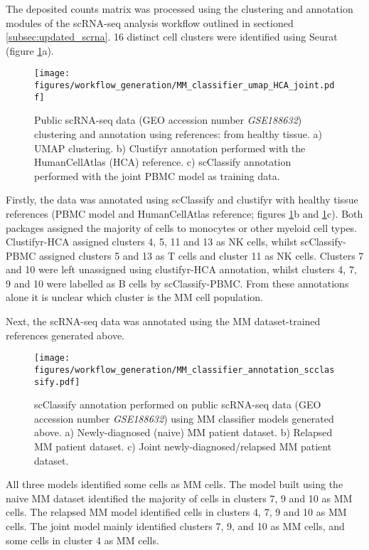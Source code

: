 The deposited counts matrix was processed using the clustering and annotation modules of the scRNA-seq analysis workflow outlined in sectioned \ref{subsec:updated_scrna}.
16 distinct cell clusters were identified using Seurat (figure \ref{fig:mm_class_umap_annotate}a).
\begin{figure}[htb]
\centering
\texttt{[image: figures/workflow\_generation/MM\_classifier\_umap\_HCA\_joint.pdf]}
\caption[Public scRNA-seq data clustering and annotation]{Public scRNA-seq data (GEO accession number \textit{GSE188632}) clustering and annotation using references: from healthy tissue.
a) UMAP clustering.
b) Clustifyr annotation performed with the HumanCellAtlas (HCA) reference.
c) scClassify annotation performed with the joint PBMC model as training data.
}
\label{fig:mm_class_umap_annotate}
\end{figure}
%
Firstly, the data was annotated using scClassify and clustifyr with healthy tissue references (PBMC model and HumanCellAtlas reference; figures \ref{fig:mm_class_umap_annotate}b and \ref{fig:mm_class_umap_annotate}c).
Both packages assigned the majority of cells to monocytes or other myeloid cell types.
Clustifyr-HCA assigned clusters 4, 5, 11 and 13 as NK cells, whilst scClassify-PBMC assigned clusters 5 and 13 as T cells and cluster 11 as NK cells.
Clusters 7 and 10 were left unassigned using clustifyr-HCA annotation, whilst clusters 4, 7, 9 and 10 were labelled as B cells by scClassify-PBMC.
From these annotations alone it is unclear which cluster is the MM cell population.

Next, the scRNA-seq data was annotated using the MM dataset-trained references generated above.
%
\begin{figure}[htb]
\centering
\texttt{[image: figures/workflow\_generation/MM\_classifier\_annotation\_scclassify.pdf]}
\caption[Public scRNA-seq data MM classifier annotation]{scClassify annotation performed on public scRNA-seq data (GEO accession number \textit{GSE188632}) using MM classifier models generated above.
a) Newly-diagnosed (naive) MM patient dataset.
b) Relapsed MM patient dataset.
c) Joint newly-diagnosed/relapsed MM patient dataset.
}
\label{fig:mm_classifier_scclassify_annotate}
\end{figure}
All three models identified some cells as MM cells.
The model built using the naive MM dataset identified the majority of cells in clusters 7, 9 and 10 as MM cells.
The relapsed MM model identified cells in clusters 4, 7, 9 and 10 as MM cells.
The joint model mainly identified clusters 7, 9, and 10 as MM cells, and some cells in cluster 4 as MM cells. 


